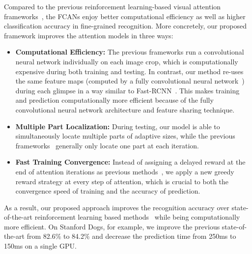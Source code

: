 \documentclass[10pt,twocolumn,letterpaper]{article}
\begin{document}
Compared to the previous reinforcement learning-based visual attention frameworks~\cite{bd1,bd3}, the FCANs enjoy better computational efficiency as well as higher classification accuracy in fine-grained recognition.
More concretely, our proposed framework improves the attention models in three ways:
\begin{itemize}
\item{\bf Computational Efficiency:} The previous frameworks run a convolutional neural network individually on each image crop, which is computationally expensive during both training and testing.
In contrast, our method re-uses the same feature maps (computed by a fully convolutional neural network~\cite{bd7,bd8}) during each glimpse in a way similar to Fast-RCNN~\cite{girshick2015fast}.
This makes training and prediction computationally more efficient because of the fully convolutional neural network architecture and feature sharing technique.
\item{\bf Multiple Part Localization:} During testing, our model is able to simultaneously locate multiple parts of adaptive sizes, while the previous frameworks~\cite{bd1,bd3} generally only locate one part at each iteration.
\item{\bf Fast Training Convergence:} Instead of assigning a delayed reward at the end of attention iterations as previous methods~\cite{bd7,bd8}, we apply a new greedy reward strategy at every step of attention, which is crucial to both the convergence speed of training and the accuracy of prediction.
\end{itemize}


As a result, our proposed approach improves the recognition accuracy over state-of-the-art reinforcement learning based methods~\cite{bd1,bd3} while being computationally more efficient. On Stanford Dogs, for example, we improve the previous state-of-the-art from 82.6\% to 84.2\% and decrease the prediction time from 250ms to 150ms on a single GPU.
\end{document}
